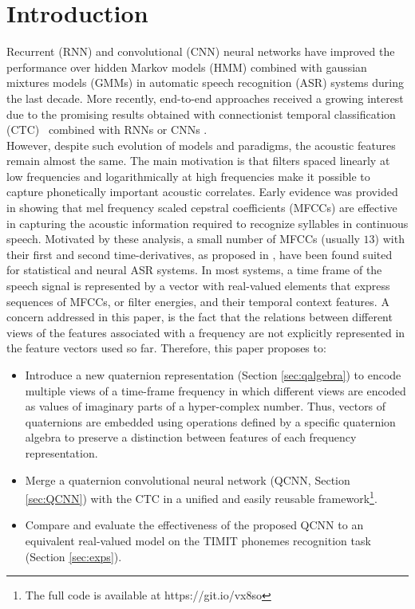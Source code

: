 \documentclass[a4paper]{article}
\begin{document}
\section{Introduction}  
Recurrent (RNN) and convolutional (CNN) neural networks have improved the performance over hidden Markov models (HMM) combined with gaussian mixtures models (GMMs) in automatic speech recognition (ASR) systems \cite{sak2014long, hinton2012deep,abdel2012applying,mirco2017timit,greff2017lstm} during the last decade.
More recently, end-to-end approaches received a growing interest due to the promising results obtained with connectionist temporal classification (CTC)~\cite{graves2006connectionist} combined with RNNs \cite{sak2014long} or CNNs \cite{zhang2017towards}.\\
However, despite such evolution of models and paradigms, the acoustic features remain almost the same. The main motivation is that filters spaced linearly at low frequencies and logarithmically at high frequencies make it possible to capture phonetically important acoustic correlates. Early evidence was provided in \cite{davis1990comparison} showing that mel frequency scaled cepstral coefficients (MFCCs) are effective in capturing the acoustic information required to recognize syllables in continuous speech.
Motivated by these analysis, a small number of MFCCs (usually $13$) with their first and second time-derivatives, as proposed in \cite{furui1986speaker}, have been found suited for statistical and neural ASR systems. In most systems, a time frame of the speech signal is represented by a vector with real-valued elements that express sequences of MFCCs, or filter energies, and their temporal context features. A concern addressed in this paper, is the fact that the relations between different views of the features associated with a frequency are not explicitly represented in the feature vectors used so far. 
Therefore, this paper proposes to:
\begin{itemize}
\item Introduce a new quaternion representation (Section \ref{sec:qalgebra}) to encode multiple views of a time-frame frequency in which different views are encoded as values of imaginary parts of a hyper-complex number. Thus, vectors of quaternions are embedded using operations defined by a specific quaternion algebra to preserve a distinction between features of each frequency representation.
\item Merge a quaternion convolutional neural network (QCNN, Section \ref{sec:QCNN}) with the CTC in a unified and easily reusable framework\footnote{The full code is available at https://git.io/vx8so}.
\item Compare and evaluate the effectiveness of the proposed QCNN to an equivalent real-valued model on the TIMIT \cite{garofolo1993darpa} phonemes recognition task (Section \ref{sec:exps}). 
\end{itemize}
\end{document}
